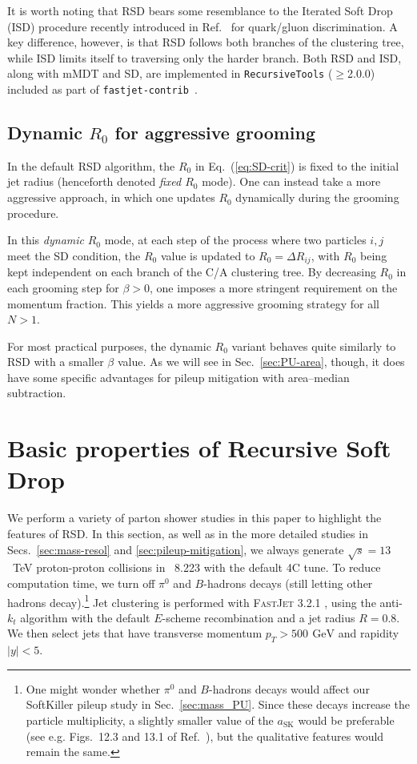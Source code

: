 \documentclass[11pt,a4paper]{article}
\newcommand{\GeV}{\,\mathrm{GeV}}
\newcommand{\pythia}[1]{\textsc{Pythia\xspace #1}}
\newcommand{\fastjet}[1]{\textsc{FastJet\xspace #1}}
\DeclareRobustCommand{\Sec}[1]{Sec.~\ref{#1}}
\DeclareRobustCommand{\Secs}[2]{Secs.~\ref{#1} and \ref{#2}}
\DeclareRobustCommand{\Eq}[1]{Eq.~(\ref{#1})}
\DeclareRobustCommand{\Ref}[1]{Ref.~\cite{#1}}
\begin{document}
It is worth noting that RSD bears some resemblance to the Iterated Soft Drop (ISD) procedure
recently introduced in \Ref{Frye:2017yrw} for quark/gluon
discrimination.
%
A key difference, however, is that RSD follows both branches of the
clustering tree, while ISD limits itself to traversing only the harder
branch.
%
Both RSD and ISD, along with mMDT and SD, are implemented in
{\tt{RecursiveTools}} ($\ge$2.0.0) included as part of
\texttt{fastjet-contrib}~\cite{fjcontrib}.


\subsection{Dynamic $R_0$ for aggressive grooming}
\label{sec:dynamicR}

In the default RSD algorithm, the $R_0$ in \Eq{eq:SD-crit} is fixed to
the initial jet radius (henceforth denoted {\it fixed $R_0$} mode).
%
One can instead take a more aggressive approach, in which one updates
$R_0$ dynamically during the grooming procedure.

In this {\it dynamic} $R_0$ mode, at each step of the process
where two particles $i,j$ meet the SD condition, the $R_0$ value is
updated to $R_0=\Delta R_{ij}$, with $R_0$ being kept independent on
each branch of the C/A clustering tree.
%
By decreasing $R_0$ in each grooming step for $\beta > 0$, one imposes a more
stringent requirement on the momentum fraction.
%
This yields a more aggressive grooming strategy for all $N>1$.

For most practical purposes, the dynamic $R_0$ variant behaves quite
similarly to RSD with a smaller $\beta$ value.
%
As we will see in \Sec{sec:PU-area}, though, it does have some
specific advantages for pileup mitigation with area--median
subtraction.

\section{Basic properties of Recursive Soft Drop}
\label{sec:basic}

We perform a variety of parton shower studies in this paper to
highlight the features of RSD.
%
In this section, as well as in the more detailed studies in
\Secs{sec:mass-resol}{sec:pileup-mitigation}, we always generate
$\sqrt{s} = 13$~TeV proton-proton collisions in \pythia~8.223
\cite{Sjostrand:2006za,Sjostrand:2007gs,Sjostrand:2014zea} with the
default 4C tune.
%
To reduce computation time, we turn off $\pi^0$ and $B$-hadrons decays (still letting
other hadrons decay).\footnote{One might wonder whether $\pi^0$ and $B$-hadrons decays
  would affect our SoftKiller pileup study in \Sec{sec:mass_PU}. 
  Since these decays increase the particle multiplicity, a slightly smaller
  value of the $a_{\text{SK}}$ would be preferable (see e.g. Figs.~12.3 and
  13.1 of \Ref{Soyez:2018opl}), but the qualitative features would remain the same.}
%
Jet clustering is performed with \fastjet{3.2.1} \cite{Cacciari:2011ma},
using the anti-$k_t$ algorithm \cite{Cacciari:2008gp} with the
default $E$-scheme recombination and a jet radius $R=0.8$.
%
We then select jets that have transverse momentum $p_T > 500~\GeV$ and
rapidity $|y|<5$.
\end{document}
